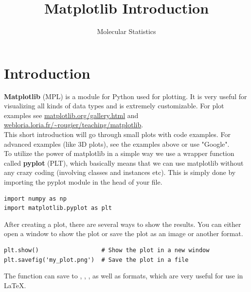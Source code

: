 \documentclass{article}
\title{Matplotlib Introduction}
\author{Molecular Statistics}
\begin{document}

\maketitle

\section{Introduction}

{\bf Matplotlib} (MPL) is a module for Python used for plotting.
It is very useful for visualizing all kinds of data types and is extremely customizable.
For plot examples see 
\href{http://matplotlib.org/gallery.html}{matplotlib.org/gallery.html} and
\href{http://webloria.loria.fr/~rougier/teaching/matplotlib/}{webloria.loria.fr/\~{}rougier/teaching/matplotlib}. \\

This short introduction will go through small plots with code examples. For advanced examples (like 3D plots), see the examples above or use "Google".\\

To utilize the power of matplotlib in a simple way we use a wrapper function called {\bf pyplot} (PLT), which basically means that we can use matplotlib without any crazy coding (involving classes and instances etc).
This is simply done by importing the pyplot module in the head of your  file.

\begin{lstlisting}
import numpy as np
import matplotlib.pyplot as plt
\end{lstlisting}

After creating a plot, there are several ways to show the results. You can either open a window to show the plot or save the plot as an image or another format.

\begin{lstlisting}
plt.show()                  # Show the plot in a new window
plt.savefig('my_plot.png')  # Save the plot in a file
\end{lstlisting}


The  function can save to
,
,
,
as well as
 formats, which are very useful for use in {\LaTeX}.\\
\end{document}
